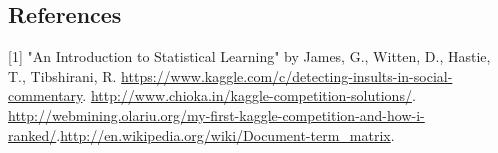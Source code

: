 \documentclass[11pt]{article}
\begin{document}
\begin{singlespacing}
\section {References}
[1]  "An Introduction to Statistical Learning" by James, G., Witten, D., Hastie, T., Tibshirani, R. \newline
[2] \url{https://www.kaggle.com/c/detecting-insults-in-social-commentary}. \newline
[3] \url{http://www.chioka.in/kaggle-competition-solutions/}. \newline
[4] \url{http://webmining.olariu.org/my-first-kaggle-competition-and-how-i-ranked/}.\newline
[5] \url{http://en.wikipedia.org/wiki/Document-term_matrix}.\newline


\end{singlespacing}
\end{document}
